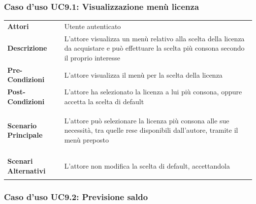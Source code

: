 \subsubsection{Caso d'uso UC9.1: Visualizzazione menù licenza}
\label{UC9_1}

\begin{minipage}{\linewidth}
	\begin{tabular}{ l | p{11cm}}
		\hline
		\rowcolor{Gray}
		\multicolumn{2}{c}{UC9.1 - Visualizzazione menù licenza} \\
		\hline
		\textbf{Attori} & Utente autenticato \\
		\textbf{Descrizione} & L'attore visualizza un menù relativo alla scelta della licenza da acquistare e può effettuare la scelta più consona secondo il proprio interesse\\
		\textbf{Pre-Condizioni} & L'attore visualizza il menù per la scelta della licenza\\
		\textbf{Post-Condizioni} & L'attore ha selezionato la licenza a lui più consona, oppure accetta la scelta di default \\
		\textbf{Scenario Principale} & 
		\begin{enumerate*}[label=(\arabic*.),itemjoin={\newline}]
			\item L'attore può selezionare la licenza più consona alle sue necessità, tra quelle rese disponibili dall'autore, tramite il menù preposto
		\end{enumerate*}\\
		\textbf{Scenari Alternativi} & 
		\begin{enumerate*}[label=(\arabic*.),itemjoin={\newline}]
			\item L'attore non modifica la scelta di default, accettandola
		\end{enumerate*}\\
	\end{tabular}
\end{minipage}

\subsubsection{Caso d'uso UC9.2: Previsione saldo}
\label{UC9_2}

